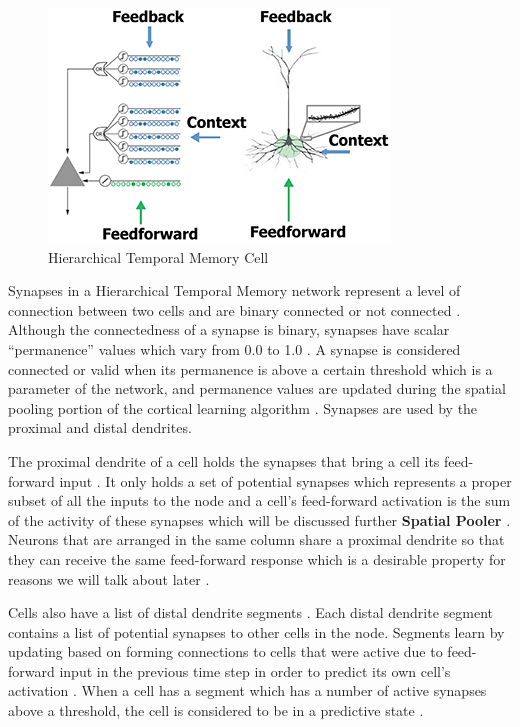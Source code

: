 \documentclass[fleqn,notitlepage,minimal]{article}
\begin{document}
	\begin{figure}[h!]
		\centering
		\includegraphics[width=\linewidth]{images/HTMCell.jpg}
		\caption{Hierarchical Temporal Memory Cell}
		\label{fig 1}
	\end{figure}
	
	Synapses in a Hierarchical Temporal Memory network represent a level of connection between two cells and are binary connected or not connected \cite{Whitepaper}. Although the connectedness of a synapse is binary, synapses have scalar ``permanence'' values which vary from 0.0 to 1.0 \cite{Principles}. A synapse is considered connected or valid when its permanence is above a certain threshold which is a parameter of the network, and permanence values are updated during the spatial pooling portion of the cortical learning algorithm \cite{Whitepaper}. Synapses are used by the proximal and distal dendrites.
	
	The proximal dendrite of a cell holds the synapses that bring a cell its feed-forward input \cite{Principles}. It only holds a set of potential synapses which represents a proper subset of all the inputs to the node and a cell's feed-forward activation is the sum of the activity of these synapses which will be discussed further \textbf{Spatial Pooler} \cite{Whitepaper}. Neurons that are arranged in the same column share a proximal dendrite so that they can receive the same feed-forward response which is a desirable property for reasons we will talk about later \cite{Whitepaper}.
	
	Cells also have a list of distal dendrite segments \cite{Whitepaper}. Each distal dendrite segment contains a list of potential synapses to other cells in the node. Segments learn by updating based on forming connections to cells that were active due to feed-forward input in the previous time step in order to predict its own cell's activation \cite{Whitepaper}. When a cell has a segment which has a number of active synapses above a threshold, the cell is considered to be in a predictive state \cite{Principles}.
	
\end{document}
